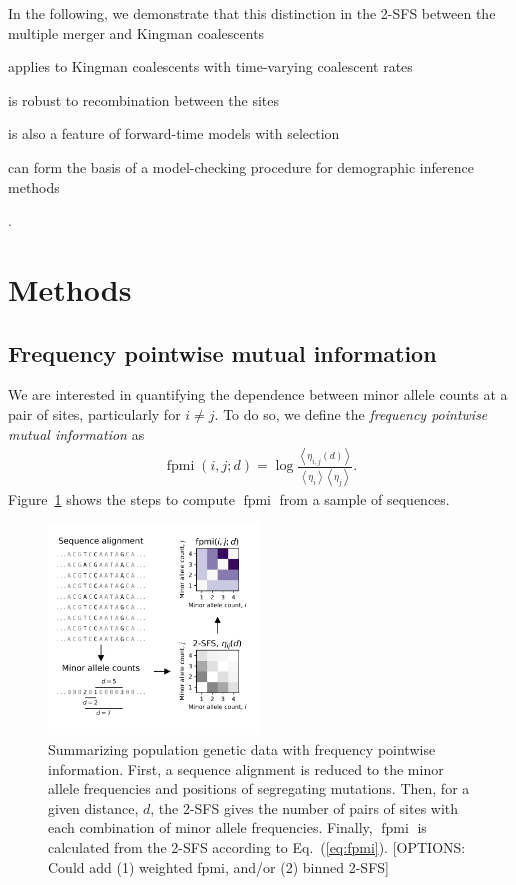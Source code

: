 \documentclass[11pt, letterpaper]{article}   	%
\newcommand{\eq}[1]{Eq.~(\ref{#1})}
\newcommand{\Fig}[1]{Figure~\ref{#1}}
\newcommand{\E}[1]{\left< #1 \right>}
\DeclareMathOperator{\fpmi}{fpmi}
\begin{document}
In the following, we demonstrate that this distinction in the 2-SFS between the multiple merger and Kingman coalescents
\begin{enumerate*}[label=(\roman*), before=\unskip{: }, itemjoin={{; }}, itemjoin*={{, and }}]
    \item applies to Kingman coalescents with time-varying coalescent rates
    \item is robust to recombination between the sites
    \item is also a feature of forward-time models with selection
    \item can form the basis of a model-checking procedure for demographic inference methods
\end{enumerate*}.


\section*{Methods}

\subsection*{Frequency pointwise mutual information}

We are interested in quantifying the dependence between minor allele counts at a pair of sites, particularly for $i\neq j$.
To do so, we define the \textit{frequency pointwise mutual information} as
\begin{align}
    \fpmi(i,j;d) = \log \frac{\E{\eta_{i,j}(d)}}{\E{\eta_i} \E{\eta_j}}.
    \label{eq:fpmi}
\end{align}
\Fig{fig:schematic} shows the steps to compute $\fpmi$ from a sample of sequences.

\begin{figure}
\centering
\includegraphics[width=0.5\textwidth]{figures/schematic.pdf}
\caption{Summarizing population genetic data with frequency pointwise information. First, a sequence alignment is reduced to the minor allele frequencies and positions of segregating mutations. Then, for a given distance, $d$, the 2-SFS gives the number of pairs of sites with each combination of minor allele frequencies. Finally, $\fpmi$ is calculated from the 2-SFS according to \eq{eq:fpmi}.
[OPTIONS: Could add (1) weighted fpmi, and/or (2) binned 2-SFS] \label{fig:schematic}}
\end{figure}
\end{document}
